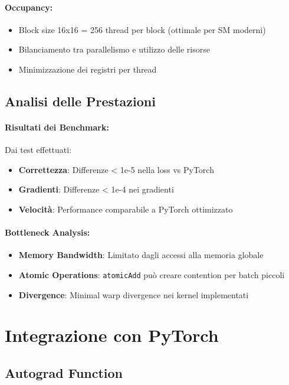 \documentclass[a4paper,11pt]{article}
\begin{document}
\paragraph{Occupancy:}
\begin{itemize}
    \item Block size 16x16 = 256 thread per block (ottimale per SM moderni)
    \item Bilanciamento tra parallelismo e utilizzo delle risorse
    \item Minimizzazione dei registri per thread
\end{itemize}

\subsection{Analisi delle Prestazioni}

\paragraph{Risultati dei Benchmark:}
Dai test effettuati:
\begin{itemize}
    \item \textbf{Correttezza}: Differenze < 1e-5 nella loss vs PyTorch
    \item \textbf{Gradienti}: Differenze < 1e-4 nei gradienti
    \item \textbf{Velocità}: Performance comparabile a PyTorch ottimizzato
\end{itemize}

\paragraph{Bottleneck Analysis:}
\begin{itemize}
    \item \textbf{Memory Bandwidth}: Limitato dagli accessi alla memoria globale
    \item \textbf{Atomic Operations}: \texttt{atomicAdd} può creare contention per batch piccoli
    \item \textbf{Divergence}: Minimal warp divergence nei kernel implementati
\end{itemize}

\section{Integrazione con PyTorch}

\subsection{Autograd Function}
\end{document}
